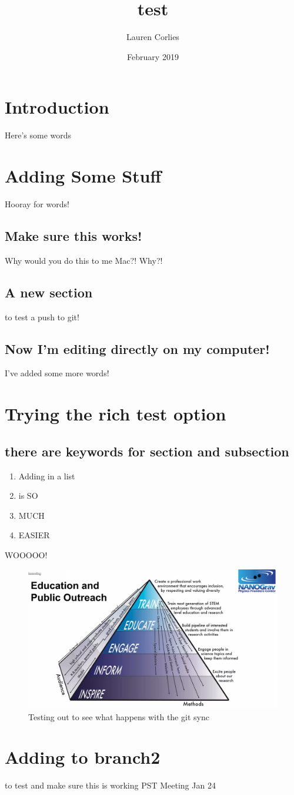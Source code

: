 \documentclass{article}
\title{test}
\author{Lauren Corlies}
\date{February 2019}
\begin{document}
\maketitle

\section{Introduction}
Here's some words

\section{Adding Some Stuff}
Hooray for words!

\subsection{Make sure this works!}
Why would you do this to me Mac?! Why?!

\subsection{A new section}
to test a push to git!

\subsection{Now I'm editing directly on my computer!}
I've added some more words!

\section{Trying the rich test option}
\subsection{there are keywords for section and subsection}
\begin{enumerate}
\item Adding in a list
\item is SO 
\item MUCH
\item EASIER
\end{enumerate}

WOOOOO!

\begin{figure}
    \centering
    \includegraphics[width=1.0\textwidth]{first_figure.png}
    \caption{Testing out to see what happens with the git sync}
    \label{fig:first}
\end{figure}


\section{Adding to branch2}
to test and make sure this is working PST Meeting Jan 24
\end{document}
